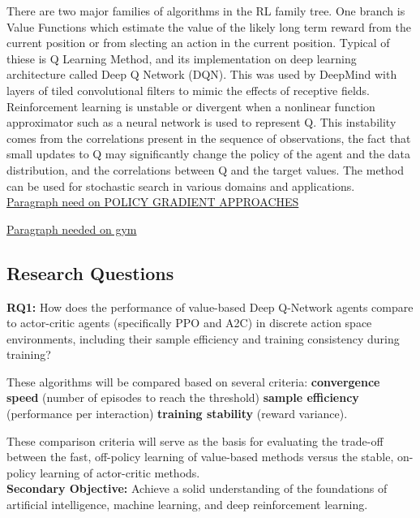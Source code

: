 There are two major families of algorithms in the RL family tree. One branch is Value Functions which estimate the value of the likely long term reward from the current position or from slecting an action in the current position. Typical of thiese is Q Learning Method, and its implementation on deep learning architecture called Deep Q Network (DQN). This was used by DeepMind with layers of tiled convolutional filters to mimic the effects of receptive fields. Reinforcement learning is unstable or divergent when a nonlinear function approximator such as a neural network is used to represent Q. This instability comes from the correlations present in the sequence of observations, the fact that small updates to Q may significantly change the policy of the agent and the data distribution, and the correlations between Q and the target values. The method can be used for stochastic search in various domains and applications.\cite{li2023reinforcement} \cite{matzliach2022detection} \\

\underline{Paragraph need on POLICY GRADIENT APPROACHES}

\underline{Paragraph needed on gym}




\subsection{Research Questions}

\textbf{RQ1:} How does the performance of value-based Deep Q-Network agents compare to actor-critic agents (specifically PPO and A2C) in discrete action space environments, including their sample efficiency and training consistency during training?


These algorithms will be compared based on several criteria: 
\textbf{convergence speed} (number of episodes to reach the threshold)
\textbf{sample efficiency} (performance per interaction)
\textbf{training stability }(reward variance). 

These comparison criteria will serve as the basis for evaluating the trade-off between the fast, off-policy learning of value-based methods versus the stable, on-policy learning of actor-critic methods. \\

\textbf{Secondary Objective:} Achieve a solid understanding of the foundations of artificial intelligence, machine learning, and deep reinforcement learning.

